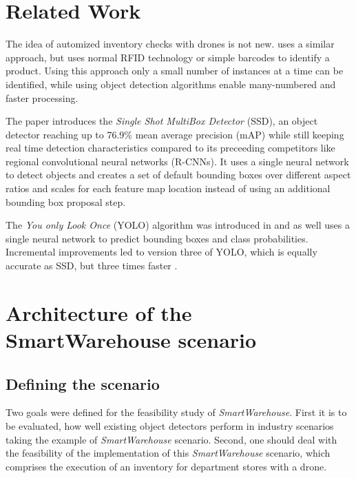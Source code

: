 \documentclass[a4paper, 10pt, journal]{wissarbIEEE}      %
\begin{document}
\section{Related Work} \label{relatedwork}

The idea of automized inventory checks with drones is not new. \cite{doks.innovationGmbH.2020} uses a similar approach, but uses normal RFID technology or simple barcodes to identify a product. Using this approach only a small number of instances at a time can be identified, while using object detection algorithms enable many-numbered and faster processing. 

The paper \cite{WeiLiuDragomirAnguelovDumitruErhanChristianSzegedyScottReedChengYangFuAlexander.2016} introduces the \textit{Single Shot MultiBox Detector} (SSD), an object detector reaching up to 76.9\% mean average precision (mAP) while still keeping real time detection characteristics compared to its preceeding competitors like regional convolutional neural networks (R-CNNs). It uses a single neural network to detect objects and creates a set of default bounding boxes over different aspect ratios and scales for each feature map location instead of using an additional bounding box proposal step. 

The \textit{You only Look Once} (YOLO) algorithm was introduced in \cite{JosephRedmonSantoshDivvalaRossGirshickAliFarhadi.2016} and as well uses a single neural network to predict bounding boxes and class probabilities. Incremental improvements led to version three of YOLO, which is equally accurate as SSD, but three times faster \cite{JosephRedmon.2018}. 

\section{Architecture of the SmartWarehouse scenario} \label{architecture}

\subsection{Defining the scenario}

Two goals were defined for the feasibility study of \textit{SmartWarehouse}. First it is to be evaluated, how well existing object detectors perform in industry scenarios taking the example of \textit{SmartWarehouse} scenario. Second, one should deal with the feasibility of the implementation of this \textit{SmartWarehouse} scenario, which comprises the execution of an inventory for department stores with a drone. 
\end{document}
